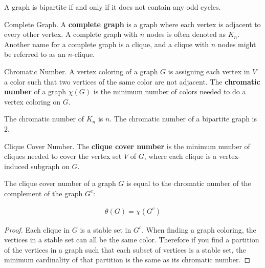 \begin{nonumtheorem}
    \label{thm:bipartite-odd}
    A graph is bipartite if and only if it does not contain any odd cycles.
\end{nonumtheorem}

\begin{definition}{Complete Graph.}
    \label{defn:clique}
    A \textbf{complete graph} is a graph where each vertex is adjacent to every other vertex. A complete graph with $n$ nodes is often denoted as $K_n$. Another name for a complete graph is a clique, and a clique with $n$ nodes might be referred to as an $n$-clique.
\end{definition}

\begin{definition}{Chromatic Number.}
    \label{defn:colors}
	A vertex coloring of a graph $G$ is assigning each vertex in $V$ a color such that two vertices of the same color are not adjacent. The \textbf{chromatic number} of a graph $\chi(G)$ is the minimum number of colors needed to do a vertex coloring on $G$.
\end{definition}

\begin{remark}
    The chromatic number of $K_n$ is $n$. The chromatic number of a bipartite graph is $2$.
\end{remark}

\begin{definition}{Clique Cover Number.}
    \label{defn:clique-cover-num}
    The \textbf{clique cover number} is the minimum number of cliques needed to cover the vertex set $V$ of $G$, where each clique is a vertex-induced subgraph on $G$.
\end{definition}

\begin{proposition}
    \label{prop:chrom-clique}
    The clique cover number of a graph $G$ is equal to the chromatic number of the complement of the graph $G^c$:
    
    \begin{align}
        \theta(G) = \chi(G^c)
    \end{align}
\end{proposition}

\begin{proof}
    Each clique in $G$ is a stable set in $G^c$. When finding a graph coloring, the vertices in a stable set can all be the same color. Therefore if you find a partition of the vertices in a graph such that each subset of vertices is a stable set, the minimum cardinality of that partition is the same as its chromatic number.
\end{proof}

